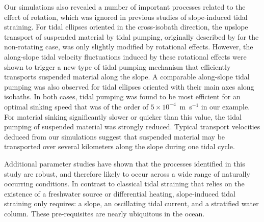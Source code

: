 Our simulations also revealed a number of important processes related
to the effect of rotation, which was ignored in previous studies of
slope-induced tidal straining. For tidal ellipses oriented in the
cross-isobath direction, the upslope transport of suspended material
by tidal pumping, originally described by \cite{schulzumlauf2016} for
the non-rotating case, was only slightly modified by rotational
effects. However, the along-slope tidal velocity fluctuations induced
by these rotational effects were shown to trigger a new type of tidal
pumping mechanism that efficiently transports suspended material along
the slope. A comparable along-slope tidal pumping was also observed
for tidal ellipses oriented with their main axes along isobaths. In
both cases, tidal pumping was found to be most efficient for an
optimal sinking speed that was of the order of $5 \times
10^{-4}$~m~s$^{-1}$ in our example. For material sinking significantly
slower or quicker than this value, the tidal pumping of suspended
material was strongly reduced. Typical transport velocities deduced
from our simulations suggest that suspended material may be
transported over several kilometers along the slope during one tidal
cycle.



Additional parameter studies have shown that the processes identified
in this study are robust, and therefore likely to occur across a wide
range of naturally occurring conditions. In contrast to classical tidal
straining that relies on the existence of a freshwater source or
differential heating, slope-induced tidal straining only requires: a
slope, an oscillating tidal current, and a stratified water
column. These pre-requisites are nearly ubiquitous in the ocean.
